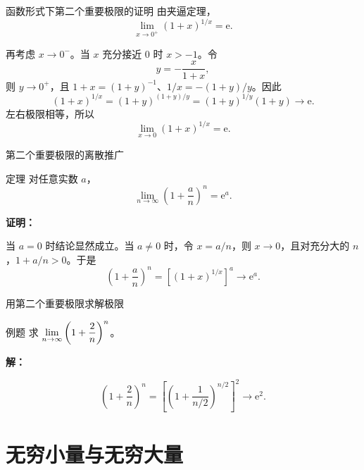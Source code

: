\documentclass[aspectratio=169,10pt]{ctexbeamer}
\newcommand{\ee}{\mathrm{e}}
\begin{document}
\begin{frame}{函数形式下第二个重要极限的证明}
	由夹逼定理，
	\[
	\lim\limits_{x\to0^+}(1+x)^{1/x}=\ee.
	\]
	
	再考虑 \(x\to0^-\)。当 \(x\) 充分接近 \(0\) 时 \(x>-1\)。令
	\[
	y=-\frac{x}{1+x},
	\]
	则 \(y\to0^+\)，且 \(1+x=(1+y)^{-1}\)、\(1/x=-(1+y)/y\)。因此
	\[
	(1+x)^{1/x}
	=(1+y)^{(1+y)/y}
	=(1+y)^{1/y}(1+y)\to\ee.
	\]
	左右极限相等，所以
	\[
	\lim\limits_{x\to0}(1+x)^{1/x}=\ee.
	\]
\end{frame}


\begin{frame}{第二个重要极限的离散推广}
	\begin{block}{定理}
		对任意实数 \(a\)，
		\[
		\lim\limits_{n\to\infty}\left(1+\frac an\right)^n=\ee^a.
		\]
	\end{block}
	
	\vspace{0.5cm}
	
	\textbf{证明：}
	
	当 \(a=0\) 时结论显然成立。当 \(a\neq0\) 时，令 \(x=a/n\)，则 \(x\to0\)，且对充分大的 \(n\)，\(1+a/n>0\)。于是
	\[
	\left(1+\frac an\right)^n
	=\left[(1+x)^{1/x}\right]^a\longrightarrow\ee^a.
	\]
\end{frame}

\begin{frame}{ 用第二个重要极限求解极限}
	\begin{block}{例题}
			求 \(\lim\limits\limits_{n\to\infty} \left(1 + \dfrac{2}{n}\right)^n\)。
	\end{block}
	
	\pause
	
	\vspace{0.6cm}
	
	\textbf{解：}
	
	
	\[
	\left(1 + \dfrac{2}{n}\right)^n = \left[\left(1 + \dfrac{1}{n/2}\right)^{n/2}\right]^2 \to \ee^2.
	\]
\end{frame}

\section{无穷小量与无穷大量}
\end{document}

